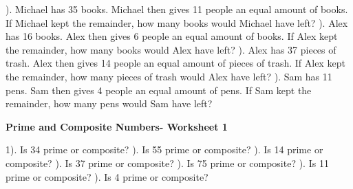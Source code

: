 \documentclass{article}%
\begin{document}
). Michael has 35 books. Michael then gives 11 people an equal amount of books. If Michael kept the remainder, how many books would Michael have left?%
\newline%
\newline%
). Alex has 16 books. Alex then gives 6 people an equal amount of books. If Alex kept the remainder, how many books would Alex have left?%
\newline%
\newline%
). Alex has 37 pieces of trash. Alex then gives 14 people an equal amount of pieces of trash. If Alex kept the remainder, how many pieces of trash would Alex have left?%
\newline%
\newline%
). Sam has 11 pens. Sam then gives 4 people an equal amount of pens. If Sam kept the remainder, how many pens would Sam have left?%
\newline%
\newline%
\newline%
\pagebreak%
\large%
\begin{center}%
\textbf{Prime and Composite Numbers- Worksheet 1}%
\newline%
\end{center} \normalsize%
1). Is 34 prime or composite?%
\newline%
\newline%
). Is 55 prime or composite?%
\newline%
\newline%
). Is 14 prime or composite?%
\newline%
\newline%
). Is 37 prime or composite?%
\newline%
\newline%
). Is 75 prime or composite?%
\newline%
\newline%
). Is 11 prime or composite?%
\newline%
\newline%
). Is 4 prime or composite?%
\end{document}
